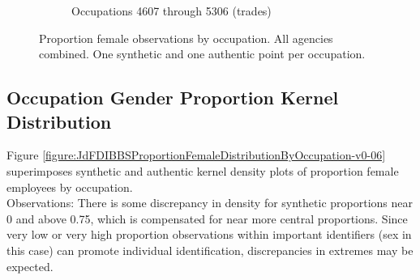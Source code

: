 \documentclass[10pt, letterpaper]{article}
\begin{document}
\begin{spacing}{1.0}
\begin{figure}[h]
\begin{subfigure}{1\textwidth}
        \caption{Occupations 4607 through 5306 (trades)}
        \vspace{10pt}
    \end{subfigure}
    \caption{Proportion female observations by occupation.  All agencies combined.  One synthetic and one authentic point per occupation.}
    \label{figure:JdFDIBBSOccupationProportionBar4}
\end{figure}

\clearpage

\subsection{Occupation Gender Proportion Kernel Distribution}

Figure \ref{figure:JdFDIBBSProportionFemaleDistributionByOccupation-v0-06} superimposes synthetic and authentic kernel density plots of proportion female employees by occupation.\\

Observations:  There is some discrepancy in density for synthetic proportions near 0 and above 0.75, which is compensated for near more central proportions.  Since very low or very high proportion observations within important identifiers (sex in this case) can promote individual identification, discrepancies in extremes may be expected.\\

\vspace{20pt}


\end{spacing}
\end{document}
